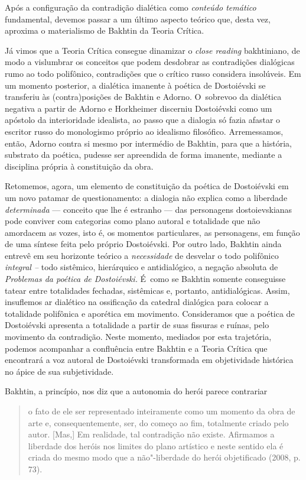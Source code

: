Após a configuração da contradição dialética como \emph{conteúdo
temático} fundamental, devemos passar a um último aspecto teórico que,
desta vez, aproxima o materialismo de Bakhtin da Teoria Crítica.

Já vimos que a Teoria Crítica consegue dinamizar o \emph{close reading}
bakhtiniano, de modo a vislumbrar os conceitos que podem desdobrar as
contradições dialógicas rumo ao todo polifônico, contradições que o
crítico russo considera insolúveis. Em um momento posterior, a dialética
imanente à poética de Dostoiévski se transferiu às (contra)posições de
Bakhtin e Adorno. O~sobrevoo da dialética negativa a partir de Adorno e
Horkheimer discerniu Dostoiévski como um apóstolo da interioridade
idealista, ao passo que a dialogia só fazia afastar o escritor russo do
monologismo próprio ao idealismo filosófico. Arremessamos, então, Adorno
contra si mesmo por intermédio de Bakhtin, para que a história,
substrato da poética, pudesse ser apreendida de forma imanente, mediante
a disciplina própria à constituição da obra.

Retomemos, agora, um elemento de constituição da poética de Dostoiévski
em um novo patamar de questionamento: a dialogia não explica como a
liberdade \emph{determinada} --- conceito que lhe é estranho --- das
personagens dostoievskianas pode conviver com categorias como plano
autoral e totalidade que não amordacem as vozes, isto é, os momentos
particulares, as personagens, em função de uma síntese feita pelo
próprio Dostoiévski. Por outro lado, Bakhtin ainda entrevê em seu
horizonte teórico a \emph{necessidade} de desvelar o todo polifônico
\emph{integral --} todo sistêmico, hierárquico e antidialógico, a
negação absoluta de \emph{Problemas da poética de Dostoiévski.} É~como
se Bakhtin somente conseguisse tatear entre totalidades fechadas,
sistêmicas e, portanto, antidialógicas. Assim, insuflemos ar dialético
na ossificação da catedral dialógica para colocar a totalidade
polifônica e aporética em movimento. Consideramos que a poética de
Dostoiévski apresenta a totalidade a partir de suas fissuras e ruínas,
pelo movimento da contradição. Neste momento, mediados por esta
trajetória, podemos acompanhar a confluência entre Bakhtin e a Teoria
Crítica que encontrará a voz autoral de Dostoiévski transformada em
objetividade histórica no ápice de sua subjetividade.

Bakhtin, a princípio, nos diz que a autonomia do herói parece contrariar

\begin{quote}
o fato de ele ser representado inteiramente como um momento da obra de
arte e, consequentemente, ser, do começo ao fim, totalmente criado pelo
autor. {[}Mas,{]} Em realidade, tal contradição não existe. Afirmamos a
liberdade dos heróis nos limites do plano artístico e neste sentido ela
é criada do mesmo modo que a não"-liberdade do herói objetificado (2008,
p. 73).
\end{quote}

